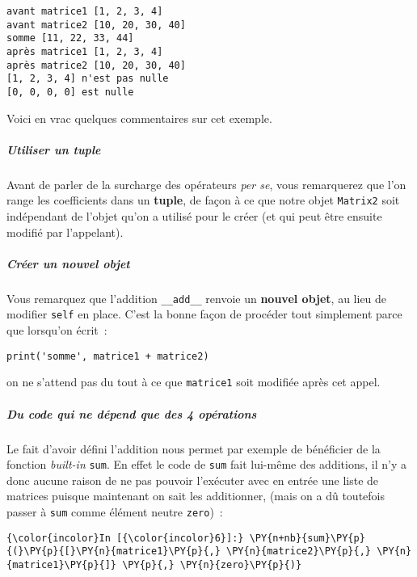     \begin{Verbatim}[commandchars=\\\{\}]
avant matrice1 [1, 2, 3, 4]
avant matrice2 [10, 20, 30, 40]
somme [11, 22, 33, 44]
après matrice1 [1, 2, 3, 4]
après matrice2 [10, 20, 30, 40]
[1, 2, 3, 4] n'est pas nulle
[0, 0, 0, 0] est nulle

    \end{Verbatim}

    Voici en vrac quelques commentaires sur cet exemple.

    \hypertarget{utiliser-un-tuple}{%
\subparagraph{Utiliser un tuple}\label{utiliser-un-tuple}}

    Avant de parler de la surcharge des opérateurs \emph{per se}, vous
remarquerez que l'on range les coefficients dans un \textbf{tuple}, de
façon à ce que notre objet \texttt{Matrix2} soit indépendant de l'objet
qu'on a utilisé pour le créer (et qui peut être ensuite modifié par
l'appelant).

    \hypertarget{cruxe9er-un-nouvel-objet}{%
\subparagraph{Créer un nouvel objet}\label{cruxe9er-un-nouvel-objet}}

    Vous remarquez que l'addition \texttt{\_\_add\_\_} renvoie un
\textbf{nouvel objet}, au lieu de modifier \texttt{self} en place. C'est
la bonne façon de procéder tout simplement parce que lorsqu'on écrit~:

\begin{verbatim}
print('somme', matrice1 + matrice2)
\end{verbatim}

on ne s'attend pas du tout à ce que \texttt{matrice1} soit modifiée
après cet appel.

    \hypertarget{du-code-qui-ne-duxe9pend-que-des-4-opuxe9rations}{%
\subparagraph{Du code qui ne dépend que des 4
opérations}\label{du-code-qui-ne-duxe9pend-que-des-4-opuxe9rations}}

    Le fait d'avoir défini l'addition nous permet par exemple de bénéficier
de la fonction \emph{built-in} \texttt{sum}. En effet le code de
\texttt{sum} fait lui-même des additions, il n'y a donc aucune raison de
ne pas pouvoir l'exécuter avec en entrée une liste de matrices puisque
maintenant on sait les additionner, (mais on a dû toutefois passer à
\texttt{sum} comme élément neutre \texttt{zero})~:

    \begin{Verbatim}[commandchars=\\\{\}]
{\color{incolor}In [{\color{incolor}6}]:} \PY{n+nb}{sum}\PY{p}{(}\PY{p}{[}\PY{n}{matrice1}\PY{p}{,} \PY{n}{matrice2}\PY{p}{,} \PY{n}{matrice1}\PY{p}{]} \PY{p}{,} \PY{n}{zero}\PY{p}{)}
\end{Verbatim}


